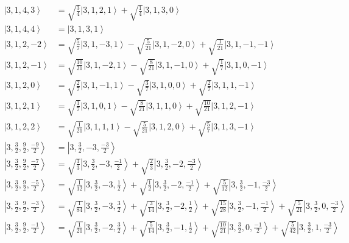 \documentclass{report}
\newcommand{\ket}[1]{\left| #1 \right>} %
\begin{document}
\begin{align*}
\ket{ 3 ,  1 ,  4 ,  3  } &=  \sqrt{  \frac{3}{4}  } \ket{ 3 ,  1 ,  2 ,  1  } + \sqrt{  \frac{1}{4}  } \ket{ 3 ,  1 ,  3 ,  0  } \\
\ket{ 3 ,  1 ,  4 ,  4  } &=  \ket{ 3 ,  1 ,  3 ,  1  } \\
\ket{ 3 ,  1 ,  2 ,  -2  } &=  \sqrt{  \frac{5}{7}  } \ket{ 3 ,  1 ,  -3 ,  1  } - \sqrt{  \frac{5}{21}  } \ket{ 3 ,  1 ,  -2 ,  0  } + \sqrt{  \frac{1}{21}  } \ket{ 3 ,  1 ,  -1 ,  -1  } \\
\ket{ 3 ,  1 ,  2 ,  -1  } &=  \sqrt{  \frac{10}{21}  } \ket{ 3 ,  1 ,  -2 ,  1  } - \sqrt{  \frac{8}{21}  } \ket{ 3 ,  1 ,  -1 ,  0  } + \sqrt{  \frac{1}{7}  } \ket{ 3 ,  1 ,  0 ,  -1  } \\
\ket{ 3 ,  1 ,  2 ,  0  } &=  \sqrt{  \frac{2}{7}  } \ket{ 3 ,  1 ,  -1 ,  1  } - \sqrt{  \frac{3}{7}  } \ket{ 3 ,  1 ,  0 ,  0  } + \sqrt{  \frac{2}{7}  } \ket{ 3 ,  1 ,  1 ,  -1  } \\
\ket{ 3 ,  1 ,  2 ,  1  } &=  \sqrt{  \frac{1}{7}  } \ket{ 3 ,  1 ,  0 ,  1  } - \sqrt{  \frac{8}{21}  } \ket{ 3 ,  1 ,  1 ,  0  } + \sqrt{  \frac{10}{21}  } \ket{ 3 ,  1 ,  2 ,  -1  } \\
\ket{ 3 ,  1 ,  2 ,  2  } &=  \sqrt{  \frac{1}{21}  } \ket{ 3 ,  1 ,  1 ,  1  } - \sqrt{  \frac{5}{21}  } \ket{ 3 ,  1 ,  2 ,  0  } + \sqrt{  \frac{5}{7}  } \ket{ 3 ,  1 ,  3 ,  -1  } \\
\ket{ 3 ,  \frac{3}{2} ,  \frac{9}{2} ,  \frac{-9}{2}  } &=  \ket{ 3 ,  \frac{3}{2} ,  -3 ,  \frac{-3}{2}  } \\
\ket{ 3 ,  \frac{3}{2} ,  \frac{9}{2} ,  \frac{-7}{2}  } &=  \sqrt{  \frac{1}{3}  } \ket{ 3 ,  \frac{3}{2} ,  -3 ,  \frac{-1}{2}  } + \sqrt{  \frac{2}{3}  } \ket{ 3 ,  \frac{3}{2} ,  -2 ,  \frac{-3}{2}  } \\
\ket{ 3 ,  \frac{3}{2} ,  \frac{9}{2} ,  \frac{-5}{2}  } &=  \sqrt{  \frac{1}{12}  } \ket{ 3 ,  \frac{3}{2} ,  -3 ,  \frac{1}{2}  } + \sqrt{  \frac{1}{2}  } \ket{ 3 ,  \frac{3}{2} ,  -2 ,  \frac{-1}{2}  } + \sqrt{  \frac{5}{12}  } \ket{ 3 ,  \frac{3}{2} ,  -1 ,  \frac{-3}{2}  } \\
\ket{ 3 ,  \frac{3}{2} ,  \frac{9}{2} ,  \frac{-3}{2}  } &=  \sqrt{  \frac{1}{84}  } \ket{ 3 ,  \frac{3}{2} ,  -3 ,  \frac{3}{2}  } + \sqrt{  \frac{3}{14}  } \ket{ 3 ,  \frac{3}{2} ,  -2 ,  \frac{1}{2}  } + \sqrt{  \frac{15}{28}  } \ket{ 3 ,  \frac{3}{2} ,  -1 ,  \frac{-1}{2}  } + \sqrt{  \frac{5}{21}  } \ket{ 3 ,  \frac{3}{2} ,  0 ,  \frac{-3}{2}  } \\
\ket{ 3 ,  \frac{3}{2} ,  \frac{9}{2} ,  \frac{-1}{2}  } &=  \sqrt{  \frac{1}{21}  } \ket{ 3 ,  \frac{3}{2} ,  -2 ,  \frac{3}{2}  } + \sqrt{  \frac{5}{14}  } \ket{ 3 ,  \frac{3}{2} ,  -1 ,  \frac{1}{2}  } + \sqrt{  \frac{10}{21}  } \ket{ 3 ,  \frac{3}{2} ,  0 ,  \frac{-1}{2}  } + \sqrt{  \frac{5}{42}  } \ket{ 3 ,  \frac{3}{2} ,  1 ,  \frac{-3}{2}  } \\

\end{align*}
\end{document}
